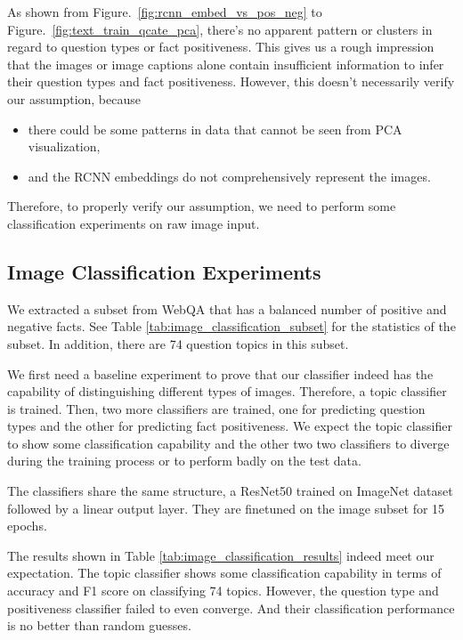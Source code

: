 \documentclass[nohyperref]{article}
\theoremstyle{plain}
\theoremstyle{definition}
\theoremstyle{remark}
\begin{document}
    As shown from Figure.~\ref{fig:rcnn_embed_vs_pos_neg} to Figure.~\ref{fig:text_train_qcate_pca}, there's no apparent pattern or clusters in regard to question types or fact positiveness.
    This gives us a rough impression that the images or image captions alone contain insufficient information to infer their question
    types and fact positiveness.
    However, this doesn't necessarily verify our assumption, because
    \begin{itemize}
        \item there could be some patterns in data that cannot be seen from PCA visualization,
        \item and the RCNN embeddings do not comprehensively represent the images.
    \end{itemize}

    Therefore, to properly verify our assumption, we need to perform some classification experiments on raw image input.

    \subsection{Image Classification Experiments}

    We extracted a subset from WebQA that has a balanced number of positive and negative facts.
    See Table \ref{tab:image_classification_subset} for the statistics of the subset.
    In addition, there are 74 question topics in this subset.

    We first need a baseline experiment to prove that our classifier indeed has the capability of
    distinguishing different types of images.
    Therefore, a topic classifier is trained.
    Then, two more classifiers are trained, one for predicting question types and the other for predicting fact
    positiveness.
    We expect the topic classifier to show some classification capability and
    the other two two classifiers to diverge during the training process or to perform badly on the test data.

    The classifiers share the same structure, a ResNet50 \cite{resnet} trained on ImageNet dataset \cite{imagenet}
    followed by a linear output layer.
    They are finetuned on the image subset for 15 epochs.

    The results shown in Table \ref{tab:image_classification_results} indeed meet our expectation.
    The topic classifier shows some classification capability in terms of accuracy and F1 score on classifying 74 topics.
    However, the question type and positiveness classifier failed to even converge.
    And their classification performance is no better than random guesses.
\end{document}
